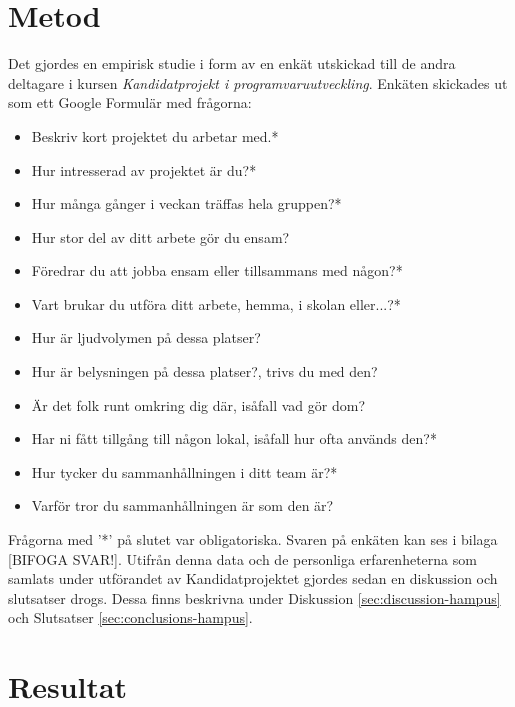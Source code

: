 \section{Metod}
\label{sec:method-hampus}

Det gjordes en empirisk studie i form av en enkät utskickad till de andra deltagare i kursen \textit{Kandidatprojekt i programvaruutveckling}. Enkäten skickades ut som ett Google Formulär med frågorna:
\begin{itemize}
\item Beskriv kort projektet du arbetar med.*
\item Hur intresserad av projektet är du?*
\item Hur många gånger i veckan träffas hela gruppen?*
\item Hur stor del av ditt arbete gör du ensam?
\item Föredrar du att jobba ensam eller tillsammans med någon?*
\item Vart brukar du utföra ditt arbete, hemma, i skolan eller...?*
\item Hur är ljudvolymen på dessa platser?
\item Hur är belysningen på dessa platser?, trivs du med den?
\item Är det folk runt omkring dig där, isåfall vad gör dom?
\item Har ni fått tillgång till någon lokal, isåfall hur ofta används den?*
\item Hur tycker du sammanhållningen i ditt team är?*
\item Varför tror du sammanhållningen är som den är?
\end{itemize}
Frågorna med '*' på slutet var obligatoriska. Svaren på enkäten kan ses i bilaga [BIFOGA SVAR!]. Utifrån denna data och de personliga erfarenheterna som samlats under utförandet av Kandidatprojektet gjordes sedan en diskussion och slutsatser drogs. Dessa finns beskrivna under Diskussion \ref{sec:discussion-hampus} och Slutsatser \ref{sec:conclusions-hampus}. 

\section{Resultat}
\label{sec:results-hampus}

